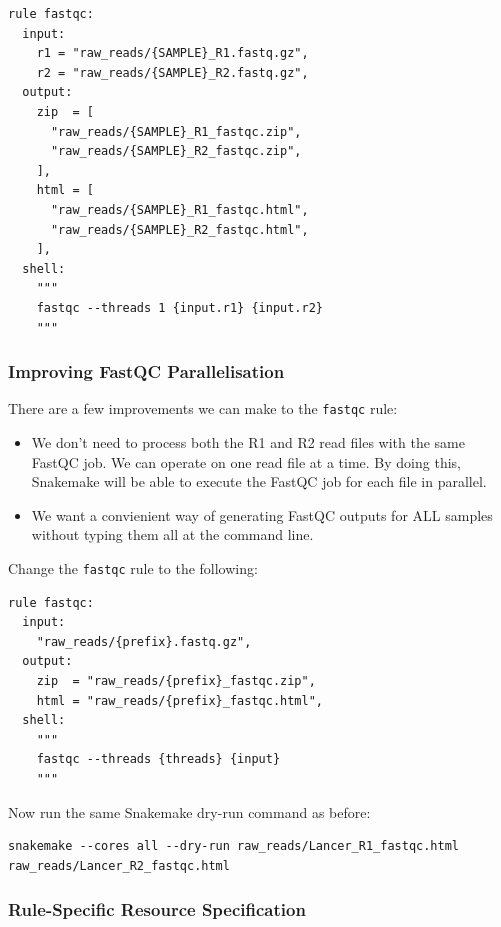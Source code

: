 \begin{lstlisting}
rule fastqc:
  input:
    r1 = "raw_reads/{SAMPLE}_R1.fastq.gz",
    r2 = "raw_reads/{SAMPLE}_R2.fastq.gz",
  output:
    zip  = [
      "raw_reads/{SAMPLE}_R1_fastqc.zip",
      "raw_reads/{SAMPLE}_R2_fastqc.zip",
    ],
    html = [
      "raw_reads/{SAMPLE}_R1_fastqc.html",
      "raw_reads/{SAMPLE}_R2_fastqc.html",
    ],
  shell:
    """
    fastqc --threads 1 {input.r1} {input.r2}
    """
\end{lstlisting}

\subsubsection{Improving FastQC Parallelisation}

There are a few improvements we can make to the \texttt{fastqc} rule:

\begin{itemize}
  \item We don't need to process both the R1 and R2 read files with the same FastQC job.
	We can operate on one read file at a time.
        By doing this, Snakemake will be able to execute the FastQC job for each file in parallel.
  \item We want a convienient way of generating FastQC outputs for ALL samples without typing them all at the command line.
\end{itemize}

Change the \texttt{fastqc} rule to the following:

\begin{lstlisting}
rule fastqc:
  input:
    "raw_reads/{prefix}.fastq.gz",
  output:
    zip  = "raw_reads/{prefix}_fastqc.zip",
    html = "raw_reads/{prefix}_fastqc.html",
  shell:
    """
    fastqc --threads {threads} {input}
    """
\end{lstlisting}

Now run the same Snakemake dry-run command as before:

\begin{lstlisting}
snakemake --cores all --dry-run raw_reads/Lancer_R1_fastqc.html raw_reads/Lancer_R2_fastqc.html
\end{lstlisting}

\subsubsection{Rule-Specific Resource Specification}

